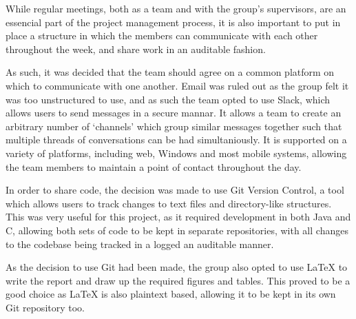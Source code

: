 
While regular meetings, both as a team and with the group's supervisors, are an essencial part of the project management process, it is also important to put in place a structure in which the members can communicate with each other throughout the week, and share work in an auditable fashion.

As such, it was decided that the team should agree on a common platform on which to communicate with one another. Email was ruled out as the group felt it was too unstructured to use, and as such the team opted to use Slack, which allows users to send messages in a secure mannar. It allows a team to create an arbitrary number of `channels' which group similar messages together such that multiple threads of conversations can be had simultaniously. It is supported on a variety of platforms, including web, Windows and most mobile systems, allowing the team members to maintain a point of contact throughout the day.

In order to share code, the decision was made to use Git Version Control, a tool which allows users to track changes to text files and directory-like structures. This was very useful for this project, as it required development in both Java and C, allowing both sets of code to be kept in separate repositories, with all changes to the codebase being tracked in a logged an auditable manner.

As the decision to use Git had been made, the group also opted to use LaTeX to write the report and draw up the required figures and tables. This proved to be a good choice as LaTeX is also plaintext based, allowing it to be kept in its own Git repository too.